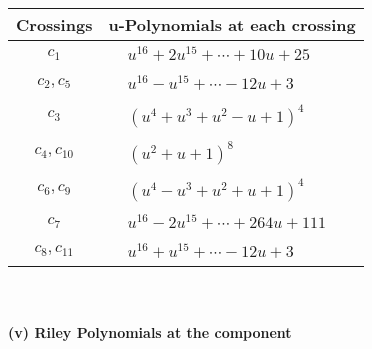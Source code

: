 \documentclass[1p]{elsarticle_modified}
\theoremstyle{definition}
\begin{document}
\begin{tabular}{m{50pt}|m{274pt}}
Crossings & \hspace{64pt}u-Polynomials at each crossing \\
\hline $$\begin{aligned}c_{1}\end{aligned}$$&$\begin{aligned}
&u^{16}+2 u^{15}+\cdots+10 u+25
\end{aligned}$\\
\hline $$\begin{aligned}c_{2},c_{5}\end{aligned}$$&$\begin{aligned}
&u^{16}- u^{15}+\cdots-12 u+3
\end{aligned}$\\
\hline $$\begin{aligned}c_{3}\end{aligned}$$&$\begin{aligned}
&(u^4+u^3+u^2- u+1)^4
\end{aligned}$\\
\hline $$\begin{aligned}c_{4},c_{10}\end{aligned}$$&$\begin{aligned}
&(u^2+u+1)^8
\end{aligned}$\\
\hline $$\begin{aligned}c_{6},c_{9}\end{aligned}$$&$\begin{aligned}
&(u^4- u^3+u^2+u+1)^4
\end{aligned}$\\
\hline $$\begin{aligned}c_{7}\end{aligned}$$&$\begin{aligned}
&u^{16}-2 u^{15}+\cdots+264 u+111
\end{aligned}$\\
\hline $$\begin{aligned}c_{8},c_{11}\end{aligned}$$&$\begin{aligned}
&u^{16}+u^{15}+\cdots-12 u+3
\end{aligned}$\\
\hline
\end{tabular}\\~\\
\newpage\renewcommand{\arraystretch}{1}
\flushleft \textbf{(v) Riley Polynomials at the component}\newline \\
\end{document}
